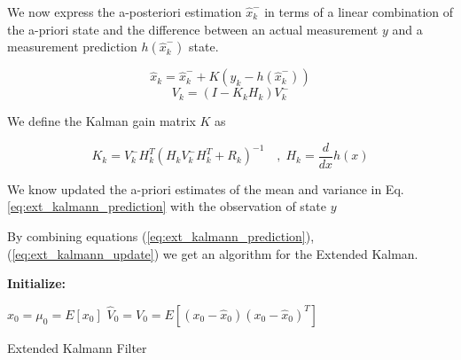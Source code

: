 \documentclass[mscthesis]{usiinfthesis}
\begin{document}
We now express the a-posteriori estimation $\hat{x}_k^-$ in terms of a linear combination of the a-priori state and the difference between an actual measurement $y$ and a measurement prediction $h(\hat{x}_k^-)$ state. 

\[
\hat{x}_k = \hat{x}_k^- + K (y_k - h(\hat{x}_k^-))
\]
\[
V_k = (I-K_k H_k)V_k^-
\]

We define the Kalman gain matrix $K$ as 

\[
K_k = V_k^- H^T_k (H_k V_k^- H^T_k + R_k)^{-1}  \quad , \; H_k = \frac{d}{dx} h(x)
\]


We know updated the a-priori estimates of the mean and variance in Eq. \ref{eq:ext_kalmann_prediction} with the observation of state $y$


By combining equations (\ref{eq:ext_kalmann_prediction}), (\ref{eq:ext_kalmann_update}) we get an algorithm for the Extended Kalman. \\

\begin{algorithm}[H]
\textbf{Initialize: }
\begin{substeps}
$\hat{x}_0 = \mu_0 = E[x_0]$ \;
$\hat{V}_0 = V_0 = E[(x_0-\hat{x}_0)(x_0-\hat{x}_0)^T]$  \;
\end{substeps}
  \caption{Extended Kalmann Filter}
  \label{algo:ext_kalmann}
\end{algorithm}
\end{document}
